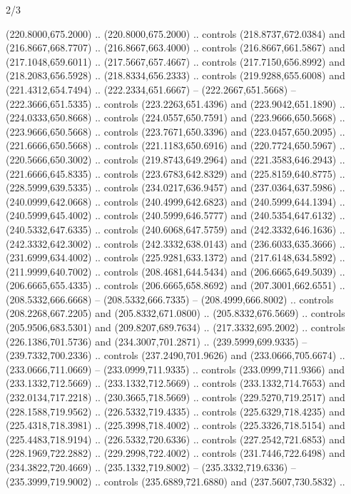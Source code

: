 \begin{flagdescription}{2/3}
\begin{scope}[xshift=0.5\flaglength,yshift=0.5\flagwidth,scale=\flagwidth/525.28]
\begin{scope}[y=0.1mm, x=0.1mm, yscale=-1,shift={(-381.5,-404)}]
\begin{scope}[shift={(5.25001,4.53053)},miter limit=4.00,line width=0.800\lw]
  (220.8000,675.2000) .. (220.8000,675.2000) .. controls (218.8737,672.0384) and
  (216.8667,668.7707) .. (216.8667,663.4000) .. controls (216.8667,661.5867) and
  (217.1048,659.6011) .. (217.5667,657.4667) .. controls (217.7150,656.8992) and
  (218.2083,656.5928) .. (218.8334,656.2333) .. controls (219.9288,655.6008) and
  (221.4312,654.7494) .. (222.2334,651.6667) -- (222.2667,651.5668) --
  (222.3666,651.5335) .. controls (223.2263,651.4396) and (223.9042,651.1890) ..
  (224.0333,650.8668) .. controls (224.0557,650.7591) and (223.9666,650.5668) ..
  (223.9666,650.5668) .. controls (223.7671,650.3396) and (223.0457,650.2095) ..
  (221.6666,650.5668) .. controls (221.1183,650.6916) and (220.7724,650.5967) ..
  (220.5666,650.3002) .. controls (219.8743,649.2964) and (221.3583,646.2943) ..
  (221.6666,645.8335) .. controls (223.6783,642.8329) and (225.8159,640.8775) ..
  (228.5999,639.5335) .. controls (234.0217,636.9457) and (237.0364,637.5986) ..
  (240.0999,642.0668) .. controls (240.4999,642.6823) and (240.5999,644.1394) ..
  (240.5999,645.4002) .. controls (240.5999,646.5777) and (240.5354,647.6132) ..
  (240.5332,647.6335) .. controls (240.6068,647.5759) and (242.3332,646.1636) ..
  (242.3332,642.3002) .. controls (242.3332,638.0143) and (236.6033,635.3666) ..
  (231.6999,634.4002) .. controls (225.9281,633.1372) and (217.6148,634.5892) ..
  (211.9999,640.7002) .. controls (208.4681,644.5434) and (206.6665,649.5039) ..
  (206.6665,655.4335) .. controls (206.6665,658.8692) and (207.3001,662.6551) ..
  (208.5332,666.6668) -- (208.5332,666.7335) -- (208.4999,666.8002) .. controls
  (208.2268,667.2205) and (205.8332,671.0800) .. (205.8332,676.5669) .. controls
  (205.9506,683.5301) and (209.8207,689.7634) .. (217.3332,695.2002) .. controls
  (226.1386,701.5736) and (234.3007,701.2871) .. (239.5999,699.9335) --
  (239.7332,700.2336) .. controls (237.2490,701.9626) and (233.0666,705.6674) ..
  (233.0666,711.0669) -- (233.0999,711.9335) .. controls (233.0999,711.9366) and
  (233.1332,712.5669) .. (233.1332,712.5669) .. controls (233.1332,714.7653) and
  (232.0134,717.2218) .. (230.3665,718.5669) .. controls (229.5270,719.2517) and
  (228.1588,719.9562) .. (226.5332,719.4335) .. controls (225.6329,718.4235) and
  (225.4318,718.3981) .. (225.3998,718.4002) .. controls (225.3326,718.5154) and
  (225.4483,718.9194) .. (226.5332,720.6336) .. controls (227.2542,721.6853) and
  (228.1969,722.2882) .. (229.2998,722.4002) .. controls (231.7446,722.6498) and
  (234.3822,720.4669) .. (235.1332,719.8002) -- (235.3332,719.6336) --
  (235.3999,719.9002) .. controls (235.6889,721.6880) and (237.5607,730.5832) ..

\end{scope}
\end{scope}
\end{scope}
\end{flagdescription}
